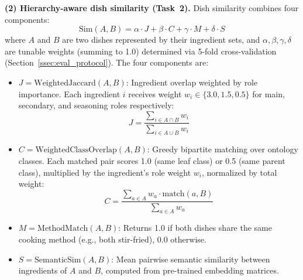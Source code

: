 \textbf{(2) Hierarchy-aware dish similarity (Task~2).}
Dish similarity combines four components:
%
\begin{equation}
\label{eq:sim}
\text{Sim}(A, B) = \alpha \cdot J + \beta \cdot C + \gamma \cdot M + \delta \cdot S
\end{equation}
%
where $A$ and $B$ are two dishes represented by their ingredient sets, and $\alpha, \beta, \gamma, \delta$ are tunable weights (summing to 1.0) determined via 5-fold cross-validation (Section~\ref{ssec:eval_protocol}). The four components are:

\begin{itemize}
  \item $J = \text{WeightedJaccard}(A, B)$: Ingredient overlap weighted by role importance. Each ingredient $i$ receives weight $w_i \in \{3.0, 1.5, 0.5\}$ for main, secondary, and seasoning roles respectively:
  \[
    J = \frac{\sum_{i \in A \cap B} w_i}{\sum_{i \in A \cup B} w_i}
  \]

  \item $C = \text{WeightedClassOverlap}(A, B)$: Greedy bipartite matching over ontology classes. Each matched pair scores 1.0 (same leaf class) or 0.5 (same parent class), multiplied by the ingredient's role weight $w_i$, normalized by total weight:
  \[
    C = \frac{\sum_{a \in A} w_a \cdot \text{match}(a, B)}{\sum_{a \in A} w_a}
  \]

  \item $M = \text{MethodMatch}(A, B)$: Returns 1.0 if both dishes share the same cooking method (e.g., both stir-fried), 0.0 otherwise.

  \item $S = \text{SemanticSim}(A, B)$: Mean pairwise semantic similarity between ingredients of $A$ and $B$, computed from pre-trained embedding matrices.
\end{itemize}


